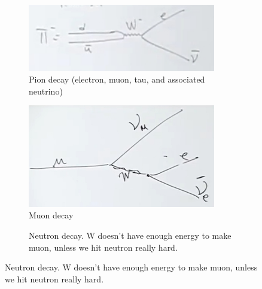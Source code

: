 \documentclass[]{article}
\begin{document}
\begin{figure}[H]
	\caption{Examples of W boson mediated decays}
	\begin{subfigure}{0.30\textwidth}
		\caption{Pion decay (electron, muon, tau, and associated neutrino)}
		\includegraphics[width=0.9\textwidth]{2-5-pion-decay}
	\end{subfigure}
	\begin{subfigure}{0.30\textwidth}
		\caption{Muon decay}
		\includegraphics[width=0.9\textwidth]{2-5-muon-decay}
	\end{subfigure}
	\begin{subfigure}{0.30\textwidth}
		\caption{Neutron decay. W doesn't have enough energy to make muon, unless we hit neutron really hard.}

\end{subfigure}
\end{figure}
\end{document}

